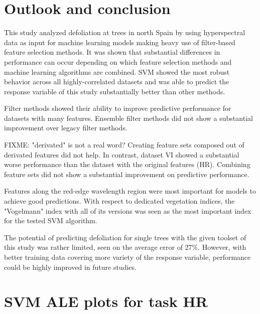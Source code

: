\documentclass[letterpaper, peerreview]{IEEEtran}
\begin{document}
\section{Outlook and conclusion}
This study analyzed defoliation at trees in north Spain by using hyperspectral data as input for machine learning models making heavy use of filter-based feature selection methods.
It was shown that substantial differences in performance can occur depending on which feature selection methods and machine learning algorithms are combined.
SVM showed the most robust behavior across all highly-correlated datasets and was able to predict the response variable of this study substantially better than other methods.

Filter methods showed their ability to improve predictive performance for datasets with many features.
Ensemble filter methods did not show a substantial improvement over legacy filter methods.

FIXME: "derivated" is not a real word?
Creating feature sets composed out of derivated features did not help.
In contrast, dataset VI showed a substantial worse performance than the dataset with the original features (HR).
Combining feature sets did not show a substantial improvement on predictive performance.

Features along the red-edge wavelength region were most important for models to achieve good predictions.
With respect to dedicated vegetation indices, the "Vogelmann" index with all of its versions was seen as the most important index for the tested SVM algorithm.

The potential of predicting defoliation for single trees with the given toolset of this study was rather limited, seen on the average error of 27\%. 
However, with better training data covering more variety of the response variable, performance could be highly improved in future studies.

\appendices{}

\section{SVM ALE plots for task HR}
\end{document}
